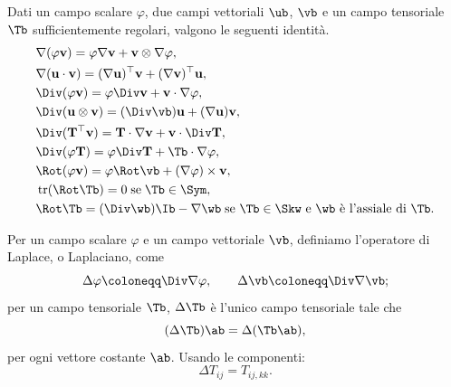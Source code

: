 Dati un campo scalare $\varphi$, due campi vettoriali $\ub$, $\vb$ e un campo tensoriale $\Tb$ sufficientemente regolari, valgono le seguenti identità.
\begin{equation}\label{identitadiff}
\begin{aligned}
&\nabla(\varphi\mathbf{v})=\varphi\nabla\mathbf{v}+\mathbf{v}\otimes\nabla\varphi,\\
& \nabla(\mathbf{u}\cdot\mathbf{v})=(\nabla\mathbf{u})^\top\mathbf{v}+(\nabla\mathbf{v})^\top\mathbf{u},\\
&\Div(\varphi\mathbf{v})=\varphi\Div\mathbf{v}+\mathbf{v}\cdot\nabla\varphi,\\
&\Div(\mathbf{u}\otimes\mathbf{v})=(\Div \vb)\mathbf{u}+(\nabla\mathbf{u})\mathbf{v},\\
&\Div(\mathbf{T}^{\top}\mathbf{v})=\mathbf{T}\cdot\nabla\mathbf{v}+\mathbf{v}\cdot\Div\mathbf{T},\\
& \Div(\varphi\mathbf{T})=\varphi\Div\mathbf{T}+\Tb\cdot\nabla\varphi,\\
&\Rot(\varphi\mathbf{v})=\varphi\Rot\vb+(\nabla\varphi)\times\mathbf{v},\\
& \operatorname{tr}(\Rot \Tb)=0 \; {\rm se}\; \Tb \in \Sym,\\
&\Rot \Tb =(\Div \wb)\Ib-\nabla \wb \; \textrm{se $\Tb\in \Skw$ e $\wb$ è l'assiale di $\Tb$}.
\end{aligned}
\end{equation}

%
%

Per un campo scalare $\varphi$ e un campo vettoriale $\vb$, definiamo l'operatore di Laplace, o Laplaciano, come
\begin{equation}
	\Delta\varphi\coloneqq \Div \nabla\varphi, \qquad \Delta \vb \coloneqq \Div \nabla \vb;
\end{equation}
per un campo tensoriale $\Tb$,  $\Delta \Tb$ è l'unico campo tensoriale tale che
\begin{equation}
	(\Delta \Tb)\ab =\Delta(\Tb \ab),
\end{equation}
per ogni vettore costante $\ab$. Usando le componenti:
\begin{equation}
	\Delta T_{ij}= T_{ij, kk}.
\end{equation}


